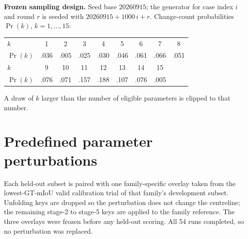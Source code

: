 \documentclass[a4paper,fleqn]{cas-dc}
\begin{document}
\begin{hlbox}
\noindent\textbf{Frozen sampling design.} Seed base $20260915$; the generator for case index $i$ and round $r$ is seeded with $20260915+1000\,i+r$. Change-count probabilities $\Pr(k)$, $k=1,\ldots,15$:
\begin{center}
\small
\setlength{\tabcolsep}{3.5pt}
\begin{tabular}{@{}l cccccccc@{}}
\toprule
$k$ & 1 & 2 & 3 & 4 & 5 & 6 & 7 & 8 \\
$\Pr(k)$ & .036 & .005 & .025 & .030 & .046 & .061 & .066 & .051 \\
\midrule
$k$ & 9 & 10 & 11 & 12 & 13 & 14 & 15 & \\
$\Pr(k)$ & .076 & .071 & .157 & .188 & .107 & .076 & .005 & \\
\bottomrule
\end{tabular}
\end{center}
A draw of $k$ larger than the number of eligible parameters is clipped to that number.
\end{hlbox}

\section{Predefined parameter perturbations}\label{app:degradation}

Each held-out subset is paired with one family-specific overlay taken from the lowest-GT-mIoU valid calibration trial of that family's development subset. Unfolding keys are dropped so the perturbation does not change the centreline; the remaining stage-2 to stage-5 keys are applied to the family reference. The three overlays were frozen before any held-out scoring. All 54 runs completed, so no perturbation was replaced.
\end{document}
